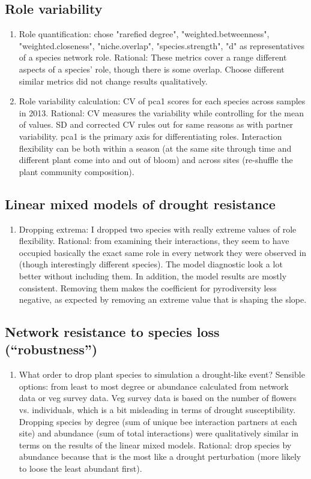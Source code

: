 \documentclass[12pt]{article}
\begin{document}
\subsection{Role variability}
\begin{enumerate}
\item Role quantification: chose "rarefied degree",
  "weighted.betweenness", "weighted.closeness", "niche.overlap",
  "species.strength", "d" as representatives of a species network
  role. Rational: These metrics cover a range different aspects of a
  species' role, though there is some overlap. Choose different
  similar metrics did not change results qualitatively.
\item Role variability calculation: CV of pca1 scores for each species
  across samples in 2013. Rational: CV measures the variability while
  controlling for the mean of values. SD and corrected CV rules out
  for same reasons as with partner variability. pca1 is the primary
  axis for differentiating roles. Interaction flexibility can be both
  within a season (at the same site through time and different plant
  come into and out of bloom) and across sites (re-shuffle the plant
  community composition).
\end{enumerate}

\subsection{Linear mixed models of drought resistance}
\begin{enumerate}
\item Dropping extrema: I dropped two species with really extreme
  values of role flexibility. Rational: from examining their
  interactions, they seem to have occupied basically the exact same
  role in every network they were observed in (though interestingly
  different species). The model diagnostic look a lot better without
  including them. In addition, the model results are mostly
  consistent. Removing them makes the coefficient for pyrodiversity
  less negative, as expected by removing an extreme value that is
  shaping the slope.
  \end{enumerate}

  
  \subsection{Network resistance to species loss (``robustness'')}
  \begin{enumerate}
  \item What order to drop plant species to simulation a drought-like
    event? Sensible options: from least to most degree or abundance
    calculated from network data or veg survey data. Veg survey data
    is based on the number of flowers vs. individuals, which is a bit
    misleading in terms of drought susceptibility. Dropping species by
    degree (sum of unique bee interaction partners at each site) and
    abundance (sum of total interactions) were qualitatively similar
    in terms on the results of the linear mixed models. Rational: drop
    species by abundance because that is the most like a drought
    perturbation (more likely to loose the least abundant first).
  \end{enumerate}

  
  
\end{document}
